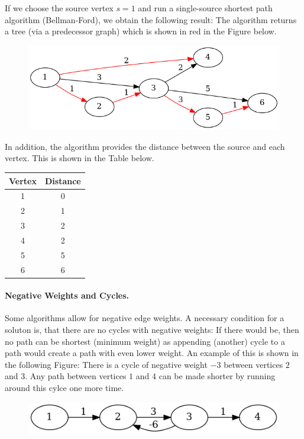 If we choose the source vertex $s=1$ and run a single-source shortest path algorithm (Bellman-Ford), we obtain the following result: The algorithm returns a tree (via a predecessor graph) which is shown in red in the Figure below.


\begin{figure}[H]
\centering
\includegraphics[scale=0.5]{images/sssp_2.png}
\end{figure}

In addition, the algorithm provides the distance between the source and each vertex. This is shown in the Table below.

\begin{tabular}{c|c}
  Vertex & Distance \\ \hline
  1 & 0 \\
  2 & 1 \\
  3 & 2 \\
  4 & 2 \\
  5 & 5 \\
  6 & 6
\end{tabular}

\paragraph{Negative Weights and Cycles.} Some algorithms allow for negative edge weights. A necessary condition for a soluton is, that there are no cycles with negative weights: If there would be, then no path can be shortest (minimum weight) as appending (another) cycle to a path would create a path with even lower weight. An example of this is shown in the following Figure: There is a cycle of negative weight $-3$ between vertices $2$ and $3$. Any path between vertices $1$ and $4$ can be made shorter by running around this cylce one more time.

\begin{figure}[H]
\centering
\includegraphics[scale=0.5]{images/sssp_3.png}
\end{figure}

